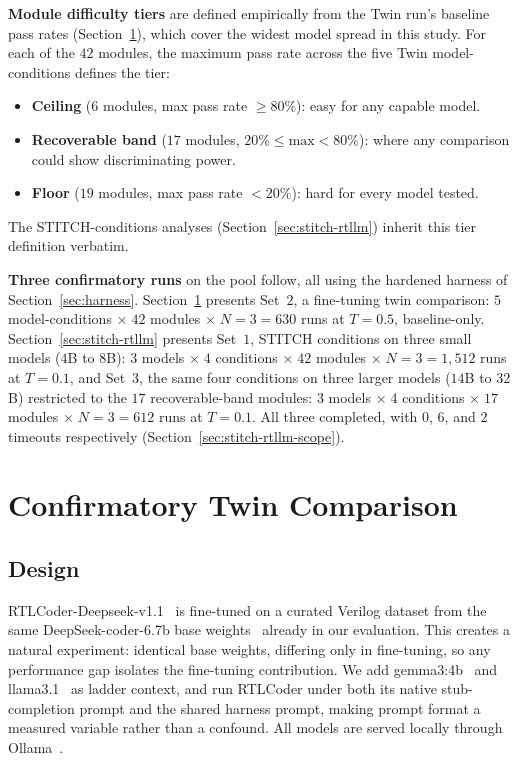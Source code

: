 \documentclass[11pt]{article}
\begin{document}
\textbf{Module difficulty tiers} are defined empirically from the Twin run's
baseline pass rates (Section~\ref{sec:twin}), which cover the widest model
spread in this study. For each of the $42$ modules, the maximum pass rate
across the five Twin model-conditions defines the tier:
\begin{itemize}[leftmargin=1.2em, itemsep=0.1em]
\item \textbf{Ceiling} ($6$ modules, max pass rate $\geq 80\%$): easy for any
      capable model.
\item \textbf{Recoverable band} ($17$ modules, $20\%\leq\text{max}<80\%$):
      where any comparison could show discriminating power.
\item \textbf{Floor} ($19$ modules, max pass rate $<20\%$): hard for every
      model tested.
\end{itemize}
The STITCH-conditions analyses (Section~\ref{sec:stitch-rtllm}) inherit this
tier definition verbatim.

\textbf{Three confirmatory runs} on the pool follow, all using the hardened
harness of Section~\ref{sec:harness}. Section~\ref{sec:twin} presents Set~$2$,
a fine-tuning twin comparison: $5$ model-conditions $\times\;42$ modules
$\times\;N{=}3=630$ runs at $T{=}0.5$, baseline-only.
Section~\ref{sec:stitch-rtllm} presents Set~$1$, STITCH conditions on three
small models ($4$B to $8$B): $3$ models $\times\;4$ conditions $\times\;42$
modules $\times\;N{=}3=1{,}512$ runs at $T{=}0.1$, and Set~$3$, the same four
conditions on three larger models ($14$B to $32$B) restricted to the $17$
recoverable-band modules: $3$ models $\times\;4$ conditions $\times\;17$
modules $\times\;N{=}3=612$ runs at $T{=}0.1$. All three completed, with $0$,
$6$, and $2$ timeouts respectively (Section~\ref{sec:stitch-rtllm-scope}).

\section{Confirmatory Twin Comparison}
\label{sec:twin}

\subsection{Design}
\label{sec:twin-design}

RTLCoder-Deepseek-v1.1~\cite{rtlcoder,rtlcoder_hf} is fine-tuned on a curated
Verilog dataset from the same DeepSeek-coder-6.7b base weights~\cite{deepseekcoder}
already in our evaluation. This creates a natural experiment: identical base
weights, differing only in fine-tuning, so any performance gap isolates the
fine-tuning contribution. We add gemma3:4b~\cite{gemma3} and
llama3.1~\cite{llama3} as ladder context, and run RTLCoder under both its
native stub-completion prompt and the shared harness prompt, making prompt
format a measured variable rather than a confound. All models are served
locally through Ollama~\cite{ollama}.
\end{document}
